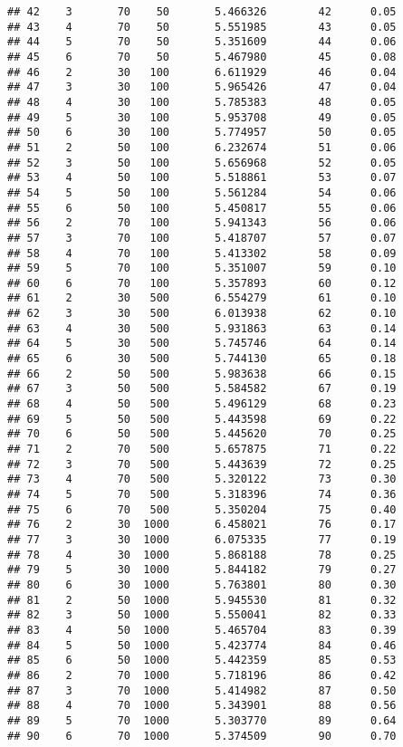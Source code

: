 \documentclass[
]{article}
\begin{document}
\begin{verbatim}
## 42    3       70    50       5.466326        42      0.05
## 43    4       70    50       5.551985        43      0.05
## 44    5       70    50       5.351609        44      0.06
## 45    6       70    50       5.467980        45      0.08
## 46    2       30   100       6.611929        46      0.04
## 47    3       30   100       5.965426        47      0.04
## 48    4       30   100       5.785383        48      0.05
## 49    5       30   100       5.953708        49      0.05
## 50    6       30   100       5.774957        50      0.05
## 51    2       50   100       6.232674        51      0.06
## 52    3       50   100       5.656968        52      0.05
## 53    4       50   100       5.518861        53      0.07
## 54    5       50   100       5.561284        54      0.06
## 55    6       50   100       5.450817        55      0.06
## 56    2       70   100       5.941343        56      0.06
## 57    3       70   100       5.418707        57      0.07
## 58    4       70   100       5.413302        58      0.09
## 59    5       70   100       5.351007        59      0.10
## 60    6       70   100       5.357893        60      0.12
## 61    2       30   500       6.554279        61      0.10
## 62    3       30   500       6.013938        62      0.10
## 63    4       30   500       5.931863        63      0.14
## 64    5       30   500       5.745746        64      0.14
## 65    6       30   500       5.744130        65      0.18
## 66    2       50   500       5.983638        66      0.15
## 67    3       50   500       5.584582        67      0.19
## 68    4       50   500       5.496129        68      0.23
## 69    5       50   500       5.443598        69      0.22
## 70    6       50   500       5.445620        70      0.25
## 71    2       70   500       5.657875        71      0.22
## 72    3       70   500       5.443639        72      0.25
## 73    4       70   500       5.320122        73      0.30
## 74    5       70   500       5.318396        74      0.36
## 75    6       70   500       5.350204        75      0.40
## 76    2       30  1000       6.458021        76      0.17
## 77    3       30  1000       6.075335        77      0.19
## 78    4       30  1000       5.868188        78      0.25
## 79    5       30  1000       5.844182        79      0.27
## 80    6       30  1000       5.763801        80      0.30
## 81    2       50  1000       5.945530        81      0.32
## 82    3       50  1000       5.550041        82      0.33
## 83    4       50  1000       5.465704        83      0.39
## 84    5       50  1000       5.423774        84      0.46
## 85    6       50  1000       5.442359        85      0.53
## 86    2       70  1000       5.718196        86      0.42
## 87    3       70  1000       5.414982        87      0.50
## 88    4       70  1000       5.343901        88      0.56
## 89    5       70  1000       5.303770        89      0.64
## 90    6       70  1000       5.374509        90      0.70
\end{verbatim}
\end{document}
